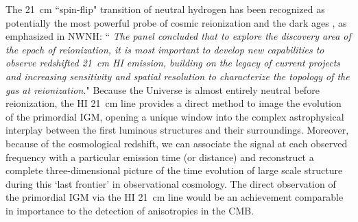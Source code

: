 \documentclass[preprint]{aastex}
\def\HI{{H{\small I }}}
\begin{document}
The 21~cm ``spin-flip" transition of  neutral hydrogen has been recognized as potentially the most powerful probe 
of cosmic reionization and  the dark ages \citep{morales_wyithe2010, furlanetto_et_al2006}, as emphasized in NWNH: 
``{\it 
The panel concluded that  to explore the discovery area of the epoch of reionization, it is most important to 
develop new capabilities to observe redshifted 21~cm \HI emission, building on the legacy of current projects and 
increasing sensitivity and spatial resolution to characterize the topology of the gas at reionization.}"  Because 
the Universe is almost entirely neutral before reionization, the HI 21~cm line provides a direct method to image 
the evolution of the primordial IGM, opening a unique window into the complex astrophysical interplay between the 
first luminous structures and their surroundings. Moreover, because of the cosmological redshift, we can associate 
the signal at each observed frequency with a particular emission time (or distance) and reconstruct a complete 
three-dimensional picture of the time evolution of large scale structure during this `last frontier' in 
observational cosmology. 
The direct observation of the primordial IGM via the HI 21~cm line would be an achievement comparable in importance 
to the detection of anisotropies in the CMB.
\end{document}
